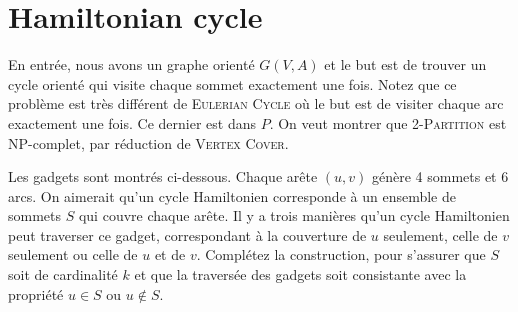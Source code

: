 \documentclass[12pt]{article}
\begin{document}
%
%

%
\section{Hamiltonian cycle}
En entrée, nous avons un graphe orienté $G(V,A)$ et le but est de trouver un cycle orienté qui visite chaque sommet exactement une fois.  Notez que ce problème est très différent de \textsc{Eulerian Cycle} où le but est de visiter chaque arc exactement une fois.  Ce dernier est dans $P$.
On veut montrer que \textsc{2-Partition} est NP-complet, par réduction de \textsc{Vertex Cover}.

Les gadgets sont montrés ci-dessous. Chaque arête $(u,v)$ génère 4 sommets et 6 arcs.  
On aimerait qu'un cycle Hamiltonien corresponde à un ensemble de sommets $S$ qui couvre chaque arête.
Il y a trois manières qu'un cycle Hamiltonien peut traverser ce gadget, correspondant à la couverture de $u$ seulement, celle de $v$ seulement ou celle de $u$ et de $v$.  Complétez la construction, pour s'assurer que $S$ soit de cardinalité $k$ et que la traversée des gadgets soit consistante avec la propriété $u\in S$ ou $u\not\in S$.
\end{document}
